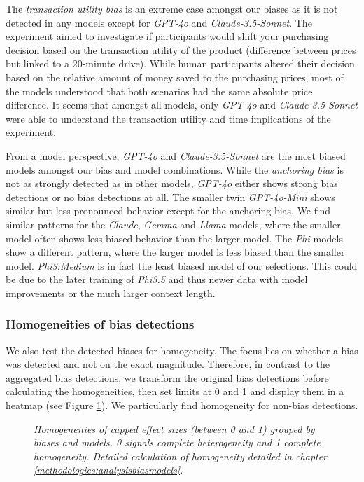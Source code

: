 \par The \textit{transaction utility bias} is an extreme case amongst our biases as it is not detected in any models except for \textit{GPT-4o} and \textit{Claude-3.5-Sonnet}. The experiment aimed to investigate if participants would shift your purchasing decision based on the transaction utility of the product (difference between prices but linked to a 20-minute drive). While human participants altered their decision based on the relative amount of money saved to the purchasing prices, most of the models understood that both scenarios had the same absolute price difference. It seems that amongst all models, only \textit{GPT-4o} and \textit{Claude-3.5-Sonnet} were able to understand the transaction utility and time implications of the experiment.

\par From a model perspective, \textit{GPT-4o} and \textit{Claude-3.5-Sonnet} are the most biased models amongst our bias and model combinations. While the \textit{anchoring bias} is not as strongly detected as in other models, \textit{GPT-4o} either shows strong bias detections or no bias detections at all. The smaller twin \textit{GPT-4o-Mini} shows similar but less pronounced behavior except for the anchoring bias. We find similar patterns for the \textit{Claude}, \textit{Gemma} and \textit{Llama} models, where the smaller model often shows less biased behavior than the larger model. The \textit{Phi} models show a different pattern, where the larger model is less biased than the smaller model. \textit{Phi3:Medium} is in fact the least biased model of our selections. This could be due to the later training of \textit{Phi3.5} and thus newer data with model improvements or the much larger context length.


\subsubsection{Homogeneities of bias detections}
\par We also test the detected biases for homogeneity. The focus lies on whether a bias was detected and not on the exact magnitude. Therefore, in contrast to the aggregated bias detections, we transform the original bias detections before calculating the homogeneities, then set limits at 0 and 1 and display them in a heatmap (see Figure \ref{fig:homogeneity-heatmap}). We particularly find homogeneity for non-bias detections.

\begin{figure}[t!]
    \centering
    
    \caption[Heatmap of homogeneities grouped by biases and models]{\centering \textit{Homogeneities of capped effect sizes (between 0 and 1) grouped by biases and models. 0 signals complete heterogeneity and 1 complete homogeneity. Detailed calculation of homogeneity detailed in chapter \ref{methodologies:analysisbiasmodels}.}}
    \label{fig:homogeneity-heatmap}
\end{figure}

